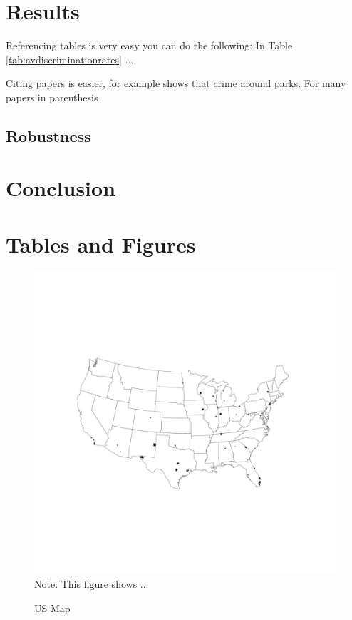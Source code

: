 \documentclass[12pt,a4paper,onecolumn]{article}
\begin{document}
\section{Results}

Referencing tables is very easy you can do the following: In Table \ref{tab:avdiscriminationrates} ...

Citing papers is easier, for example \cite{albouy2020unlocking} shows that crime around parks. For many papers in parenthesis \cite{albouy2020unlocking,mcmillen2019more} 

\subsection{Robustness}
\section{Conclusion}






\pagebreak
\singlespacing

\pagebreak


\section*{Tables and Figures}


%

\pagebreak

\begin{figure}[H]
\caption{US Map} \label{fig:robust}
    \includegraphics[scale=0.75]{../views/fig1a.pdf}   
 \flushleft
 Note: This figure shows ...
\end{figure}
\end{document}

